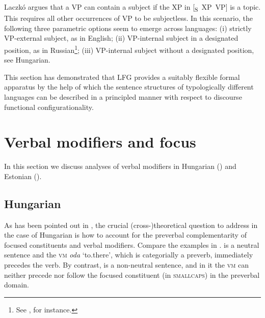\documentclass[output=paper,hidelinks]{langscibook}
\begin{document}
\ea%
\label{ex:FinnoUgric:5}
\z
Laczkó argues that a VP can contain a subject if the XP in \mbox{[\textsubscript{S} XP VP]} is a topic. This requires all other occurrences of VP to be subjectless. In this scenario, the following three parametric options seem to emerge across languages: (i) strictly VP-external subject, as in English; (ii) VP-internal subject in a designated position, as in Russian\footnote{See \citet{King95}, for instance.}; (iii) VP-internal subject without a designated position, see Hungarian.


This section has demonstrated that LFG provides a suitably flexible formal apparatus by the help of which the sentence structures of typologically different languages can be described in a principled manner with respect to discourse functional configurationality.

\section{Verbal modifiers and focus}
\label{sec:FinnoUgric:3}

In this section we discuss analyses of verbal modifiers in Hungarian () and Estonian ().

\subsection{Hungarian}
\label{sec:FinnoUgric:3.1}

As has been pointed out in , the crucial (cross-)theoretical question to address in the case of Hungarian is how to account for the preverbal complementarity of focused constituents and verbal modifiers. Compare the examples in .  is a neutral sentence and the \textsc{vm} \textit{oda} `to.there', which is categorially a preverb, immediately precedes the verb. By contrast,  is a non-neutral sentence, and in it the \textsc{vm} can neither precede nor follow the focused constituent (in \textsc{smallcaps}) in the preverbal domain.
\end{document}
